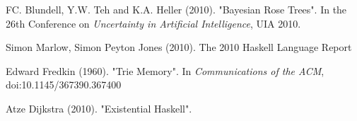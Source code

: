 \documentclass[twoside]{article}
\begin{document}
\begin{multicols}{2}
\begin{thebibliography}{99} %

FC. Blundell, Y.W. Teh and K.A. Heller (2010).
\newblock "Bayesian Rose Trees".
\newblock In the 26th Conference on {\em Uncertainty in Artificial Intelligence}, UIA 2010.

Simon Marlow, Simon Peyton Jones (2010).
\newblock The 2010 Haskell Language Report

Edward Fredkin (1960).
\newblock "Trie Memory".
\newblock In {\em Communications of the ACM}, doi:10.1145/367390.367400

Atze Dijkstra (2010).
\newblock "Existential Haskell".


\end{thebibliography}


\end{multicols}
\end{document}
